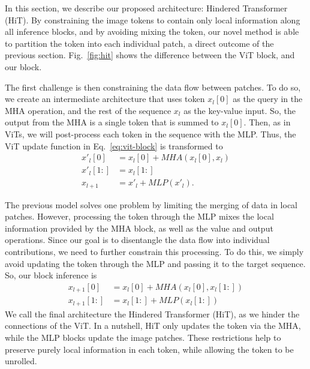 In this section, we describe our proposed architecture: Hindered Transformer (HiT). By constraining the image tokens to contain only local information along all inference blocks, and by avoiding mixing the \CLS token, our novel method is able to partition the \CLS token into each individual patch, a direct outcome of the previous section. Fig.~\ref{fig:hit} shows the difference between the ViT block, and our block.


The first challenge is then constraining the data flow between patches.
To do so, we create an intermediate architecture that uses \CLS token $x_l[0]$ as the query in the MHA operation, and the rest of the sequence $x_l$ as the key-value input.
So, the output from the MHA is a single token that is summed to $x_l[0]$.
Then, as in ViTs, we will post-process each token in the sequence with the MLP.
Thus, the ViT update function in Eq.~\ref{eq:vit-block} is transformed to
\begin{equation}\label{eq:pat-block}
\begin{split}
    x'_l[0] &= x_l[0] + MHA(x_l[0], x_l)\\
    x'_l[1:] &= x_l[1:] \\
    x_{l+1} &= x'_l + MLP(x'_l).
\end{split}
\end{equation}

The previous model solves one problem by limiting the merging of data in local patches. 
However, processing the \CLS token through the MLP mixes the local information provided by the MHA block, as well as the value and output operations. 
Since our goal is to disentangle the data flow into individual contributions, we need to further constrain this processing.
To do this, we simply avoid updating the \CLS token through the MLP and passing it to the target sequence.
So, our block inference is
\begin{equation}\label{eq:hit-block}
\begin{split}
    x_{l+1}[0] &= x_l[0] + MHA(x_l[0], x_l[1:])\\
    x_{l+1}[1:] &= x_l[1:] + MLP(x_l[1:])
\end{split}
\end{equation}
We call the final architecture the Hindered Transformer (HiT), as we hinder the connections of the ViT. 
In a nutshell, HiT only updates the \CLS token via the MHA, while the MLP blocks update the image patches. These restrictions help to preserve purely local information in each token, while allowing the \CLS token to be unrolled. 

